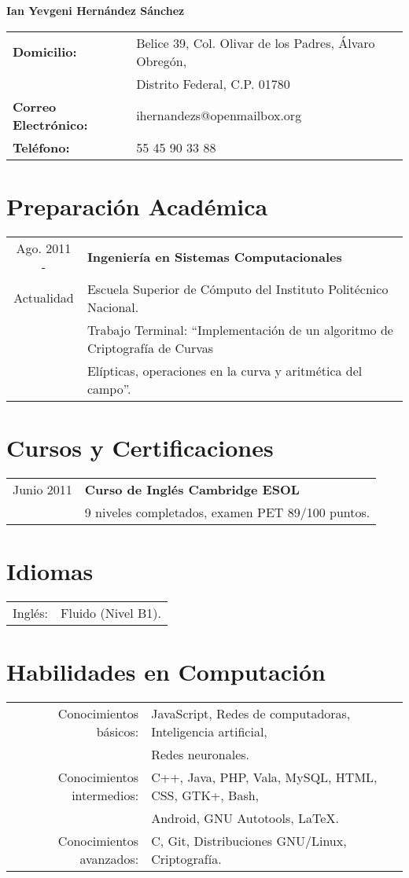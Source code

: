 \documentclass[11pt, letterpaper, oneside]{report}
\begin{document}
	\centering\huge\textbf{Ian Yevgeni Hernández Sánchez} \\[7mm]
	\centering\normalsize
	\begin{tabular}{l l}
	\textbf{Domicilio:} & Belice 39, Col. Olivar de los Padres, Álvaro Obregón, \\
	 & Distrito Federal, C.P. 01780 \\[1mm]
	\textbf{Correo Electrónico:} & ihernandezs@openmailbox.org \\[1mm]
	\textbf{Teléfono:} & 55 45 90 33 88
	\end{tabular}

	\section{Preparación Académica}
	\justify
	\begin{tabular}{c l}
	Ago. 2011 - & \textbf{Ingeniería en Sistemas Computacionales} \\
	Actualidad & Escuela Superior de Cómputo del Instituto Politécnico Nacional. \\[2mm]
	& Trabajo Terminal: ``Implementación de un algoritmo de Criptografía de Curvas \\
	& Elípticas, operaciones en la curva y aritmética del campo''.
	\end{tabular}

	\section{Cursos y Certificaciones}
	\justify
	\begin{tabular}{c l}
	Junio 2011 & \textbf{Curso de Inglés Cambridge ESOL} \\
	 & 9 niveles completados, examen PET 89/100 puntos.
	\end{tabular}

	\section{Idiomas}
	\justify
	\begin{tabular}{r l}
	Inglés: & Fluido (Nivel B1).
	\end{tabular}

	\section{Habilidades en Computación}
	\justify
	\begin{tabular}{r l}
	Conocimientos básicos: & JavaScript, Redes de computadoras, Inteligencia artificial, \\
	 & Redes neuronales. \\
	Conocimientos intermedios: & C++, Java, PHP, Vala, MySQL, HTML, CSS, GTK+, Bash, \\
	 & Android, GNU Autotools, \LaTeX. \\
	Conocimientos avanzados: & C, Git, Distribuciones GNU/Linux, Criptografía.
	\end{tabular}
\end{document}
